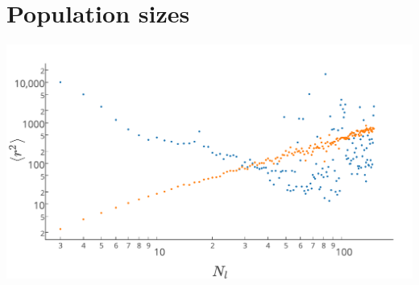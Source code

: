 \section{Population sizes}

\begin{Figure}
  \centerfloat
     \includegraphics[width=\linewidth]{r_squared_pop.pdf}
 \label{fig:r_squared_pop}
\end{Figure}
